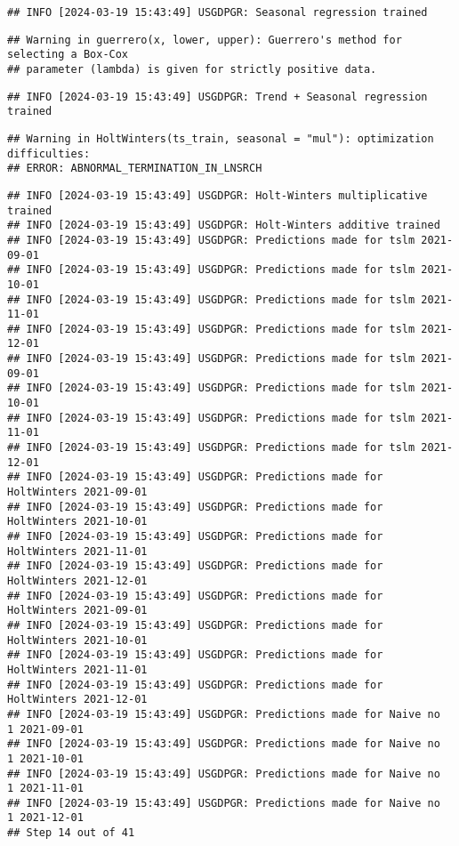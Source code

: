 \documentclass[
]{article}
\begin{document}
\begin{verbatim}
## INFO [2024-03-19 15:43:49] USGDPGR: Seasonal regression trained
\end{verbatim}

\begin{verbatim}
## Warning in guerrero(x, lower, upper): Guerrero's method for selecting a Box-Cox
## parameter (lambda) is given for strictly positive data.
\end{verbatim}

\begin{verbatim}
## INFO [2024-03-19 15:43:49] USGDPGR: Trend + Seasonal regression trained
\end{verbatim}

\begin{verbatim}
## Warning in HoltWinters(ts_train, seasonal = "mul"): optimization difficulties:
## ERROR: ABNORMAL_TERMINATION_IN_LNSRCH
\end{verbatim}

\begin{verbatim}
## INFO [2024-03-19 15:43:49] USGDPGR: Holt-Winters multiplicative trained
## INFO [2024-03-19 15:43:49] USGDPGR: Holt-Winters additive trained
## INFO [2024-03-19 15:43:49] USGDPGR: Predictions made for tslm 2021-09-01
## INFO [2024-03-19 15:43:49] USGDPGR: Predictions made for tslm 2021-10-01
## INFO [2024-03-19 15:43:49] USGDPGR: Predictions made for tslm 2021-11-01
## INFO [2024-03-19 15:43:49] USGDPGR: Predictions made for tslm 2021-12-01
## INFO [2024-03-19 15:43:49] USGDPGR: Predictions made for tslm 2021-09-01
## INFO [2024-03-19 15:43:49] USGDPGR: Predictions made for tslm 2021-10-01
## INFO [2024-03-19 15:43:49] USGDPGR: Predictions made for tslm 2021-11-01
## INFO [2024-03-19 15:43:49] USGDPGR: Predictions made for tslm 2021-12-01
## INFO [2024-03-19 15:43:49] USGDPGR: Predictions made for HoltWinters 2021-09-01
## INFO [2024-03-19 15:43:49] USGDPGR: Predictions made for HoltWinters 2021-10-01
## INFO [2024-03-19 15:43:49] USGDPGR: Predictions made for HoltWinters 2021-11-01
## INFO [2024-03-19 15:43:49] USGDPGR: Predictions made for HoltWinters 2021-12-01
## INFO [2024-03-19 15:43:49] USGDPGR: Predictions made for HoltWinters 2021-09-01
## INFO [2024-03-19 15:43:49] USGDPGR: Predictions made for HoltWinters 2021-10-01
## INFO [2024-03-19 15:43:49] USGDPGR: Predictions made for HoltWinters 2021-11-01
## INFO [2024-03-19 15:43:49] USGDPGR: Predictions made for HoltWinters 2021-12-01
## INFO [2024-03-19 15:43:49] USGDPGR: Predictions made for Naive no  1 2021-09-01
## INFO [2024-03-19 15:43:49] USGDPGR: Predictions made for Naive no  1 2021-10-01
## INFO [2024-03-19 15:43:49] USGDPGR: Predictions made for Naive no  1 2021-11-01
## INFO [2024-03-19 15:43:49] USGDPGR: Predictions made for Naive no  1 2021-12-01
## Step 14 out of 41
\end{verbatim}
\end{document}
